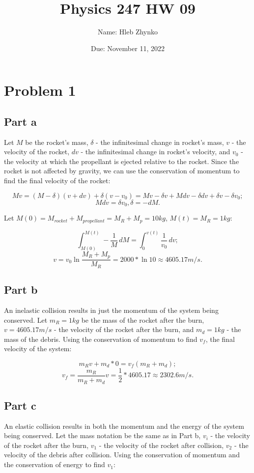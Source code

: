 \documentclass{article}
\title{Physics 247 HW 09}
\author{Name: Hleb Zhynko}
\date{Due: November 11, 2022}
\begin{document}
\maketitle

\section*{Problem 1}
\subsection*{Part a}
Let $M$ be the rocket's mass, $\delta$ - the infinitesimal change in rocket's mass, $v$ - the velocity of the rocket, $dv$ - the infinitesimal change in rocket's velocity, and $v_0$ - the velocity at which the propellant is ejected relative to the rocket. Since the rocket is not affected by gravity, we can use the conservation of momentum to find the final velocity of the rocket:

\[
Mv = (M-\delta)(v+dv) + \delta(v-v_0) = Mv - \delta v + Mdv - \delta dv + \delta v - \delta v_0;
\]
\[
Mdv = \delta v_0, \delta = -dM.
\]

Let $M(0) = M_{rocket} + M_{propellant} = M_R + M_p = 10kg$, $M(t) = M_R = 1kg$:

\[
\int_{M(0)}^{M(t)} -\frac{1}{M} \,dM = \int_{0}^{v(t)} \frac{1}{v_0} \,dv;
\]
\[
v = v_0 \ln\frac{M_R + M_p}{M_R} = 2000 * \ln10 \approx 4605.17 m/s.
\]

\subsection*{Part b}
An inelastic collision results in just the momentum of the system being conserved. Let $m_R = 1kg$ be the mass of the rocket after the burn, $v = 4605.17 m/s$ - the velocity of the rocket after the burn, and $m_d = 1kg$ - the mass of the debris. Using the conservation of momentum to find $v_f$, the final velocity of the system:

\[
m_Rv + m_d * 0 = v_f(m_R + m_d);
\]
\[
v_f = \frac{m_R}{m_R + m_d}v = \frac{1}{2} * 4605.17 \approx 2302.6 m/s.
\]

\subsection*{Part c}
An elastic collision results in both the momentum and the energy of the system being conserved. Let the mass notation be the same as in Part b, $v_i$ - the velocity of the rocket after the burn, $v_1$ - the velocity of the rocket after collision, $v_2$ - the velocity of the debris after collision. Using the conservation of momentum and the conservation of energy to find $v_1$:
\end{document}
